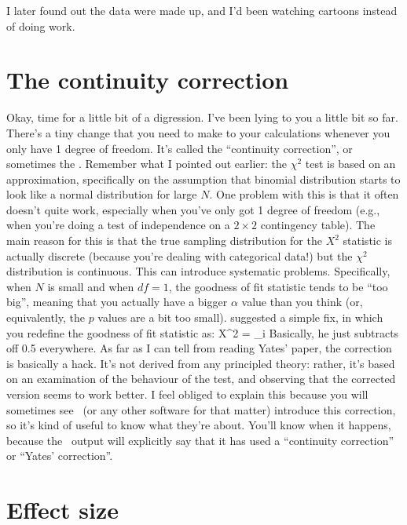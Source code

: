 
I later found out the data were made up, and I'd been watching cartoons instead of doing work.
\vspace*{12pt}




\section{The continuity correction~\label{sec:yates}}

Okay, time for a little bit of a digression. I've been lying to you a little bit so far. There's a tiny change that you need to make to your calculations whenever you only have 1 degree of freedom. It's called the ``continuity correction'', or sometimes the . Remember what I pointed out earlier: the $\chi^2$ test is based on an approximation, specifically on the assumption that binomial distribution starts to look like a normal distribution for large $N$. One problem with this is that it often doesn't quite work, especially when you've only got 1 degree of freedom (e.g., when you're doing a test of independence on a $2 \times 2$ contingency table). The main reason for this is that the true sampling distribution for the $X^2$ statistic is actually discrete (because you're dealing with categorical data!) but the $\chi^2$ distribution is continuous. This can introduce systematic problems. Specifically, when $N$ is small and when $df=1$, the goodness of fit statistic tends to be ``too big'', meaning that you actually have a bigger $\alpha$ value than you think (or, equivalently, the $p$ values are a bit too small).  suggested a simple fix, in which you redefine the goodness of fit statistic as:
\be
X^2 = \sum_{i} 
\ee
Basically, he just subtracts off 0.5 everywhere. As far as I can tell from reading Yates' paper, the correction is basically a hack. It's not derived from any principled theory: rather, it's based on an examination of the behaviour of the test, and observing that the corrected version seems to work better. I feel obliged to explain this because you will sometimes see \R\ (or any other software for that matter) introduce this correction, so it's kind of useful to know what they're about. You'll know when it happens, because the \R\ output will explicitly say that it has used a ``continuity correction'' or ``Yates' correction''.


\section{Effect size~\label{sec:chisqeffectsize}}

